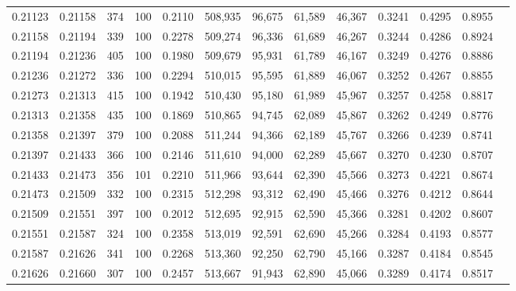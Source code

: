 \begin{tabular}{rrrrrrrrrrrrr}
0.21123 & 0.21158 &   374 & 100 &                                     0.2110 & 508,935 &  96,675 &  61,589 &  46,367 & 0.3241 & 0.4295 & 0.8955 \\
0.21158 & 0.21194 &   339 & 100 &                                     0.2278 & 509,274 &  96,336 &  61,689 &  46,267 & 0.3244 & 0.4286 & 0.8924 \\
0.21194 & 0.21236 &   405 & 100 &                                     0.1980 & 509,679 &  95,931 &  61,789 &  46,167 & 0.3249 & 0.4276 & 0.8886 \\
0.21236 & 0.21272 &   336 & 100 &                                     0.2294 & 510,015 &  95,595 &  61,889 &  46,067 & 0.3252 & 0.4267 & 0.8855 \\
0.21273 & 0.21313 &   415 & 100 &                                     0.1942 & 510,430 &  95,180 &  61,989 &  45,967 & 0.3257 & 0.4258 & 0.8817 \\
0.21313 & 0.21358 &   435 & 100 &                                     0.1869 & 510,865 &  94,745 &  62,089 &  45,867 & 0.3262 & 0.4249 & 0.8776 \\
0.21358 & 0.21397 &   379 & 100 &                                     0.2088 & 511,244 &  94,366 &  62,189 &  45,767 & 0.3266 & 0.4239 & 0.8741 \\
0.21397 & 0.21433 &   366 & 100 &                                     0.2146 & 511,610 &  94,000 &  62,289 &  45,667 & 0.3270 & 0.4230 & 0.8707 \\
0.21433 & 0.21473 &   356 & 101 &                                     0.2210 & 511,966 &  93,644 &  62,390 &  45,566 & 0.3273 & 0.4221 & 0.8674 \\
0.21473 & 0.21509 &   332 & 100 &                                     0.2315 & 512,298 &  93,312 &  62,490 &  45,466 & 0.3276 & 0.4212 & 0.8644 \\
0.21509 & 0.21551 &   397 & 100 &                                     0.2012 & 512,695 &  92,915 &  62,590 &  45,366 & 0.3281 & 0.4202 & 0.8607 \\
0.21551 & 0.21587 &   324 & 100 &                                     0.2358 & 513,019 &  92,591 &  62,690 &  45,266 & 0.3284 & 0.4193 & 0.8577 \\
0.21587 & 0.21626 &   341 & 100 &                                     0.2268 & 513,360 &  92,250 &  62,790 &  45,166 & 0.3287 & 0.4184 & 0.8545 \\
0.21626 & 0.21660 &   307 & 100 &                                     0.2457 & 513,667 &  91,943 &  62,890 &  45,066 & 0.3289 & 0.4174 & 0.8517 \\

\end{tabular}
